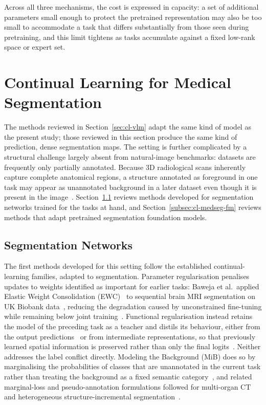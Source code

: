 Across all three mechanisms, the cost is expressed in capacity: a set of additional parameters small enough to protect the pretrained representation may also be too small to accommodate a task that differs substantially from those seen during pretraining, and this limit tightens as tasks accumulate against a fixed low-rank space or expert set.

\section{Continual Learning for Medical Segmentation}
\label{sec:cl-medseg}

The methods reviewed in Section~\ref{sec:cl-vlm} adapt the same kind of model as the present study; those reviewed in this section produce the same kind of prediction, dense segmentation maps. The setting is further complicated by a structural challenge largely absent from natural-image benchmarks: datasets are frequently only partially annotated. Because 3D radiological scans inherently capture complete anatomical regions, a structure annotated as foreground in one task may appear as unannotated background in a later dataset even though it is present in the image~\cite{liu2022learningincrementallysegmentmultiple, ji2023continualsegmentsingleunified}. Section~\ref{subsec:cl-medseg-net} reviews methods developed for segmentation networks trained for the tasks at hand, and Section~\ref{subsec:cl-medseg-fm} reviews methods that adapt pretrained segmentation foundation models.

\subsection{Segmentation Networks}
\label{subsec:cl-medseg-net}

The first methods developed for this setting follow the established continual-learning families, adapted to segmentation. Parameter regularisation penalises updates to weights identified as important for earlier tasks: Baweja et al.\ applied Elastic Weight Consolidation (EWC)~\cite{Kirkpatrick_2017} to sequential brain MRI segmentation on UK Biobank data~\cite{ukbiobank}, reducing the degradation caused by unconstrained fine-tuning while remaining below joint training~\cite{baweja2018continuallearningmedicalimaging}. Functional regularisation instead retains the model of the preceding task as a teacher and distils its behaviour, either from the output predictions~\cite{Ozdemir_2018} or from intermediate representations, so that previously learned spatial information is preserved rather than only the final logits~\cite{michieli2019incrementallearningtechniquessemantic}. Neither addresses the label conflict directly. Modeling the Background (MiB) does so by marginalising the probabilities of classes that are unannotated in the current task rather than treating the background as a fixed semantic category~\cite{cermelli2020modelingbackgroundincrementallearning}, and related marginal-loss and pseudo-annotation formulations followed for multi-organ CT and heterogeneous structure-incremental segmentation~\cite{liu2022learningincrementallysegmentmultiple, liu2023incrementallearningheterogeneousstructure}.

